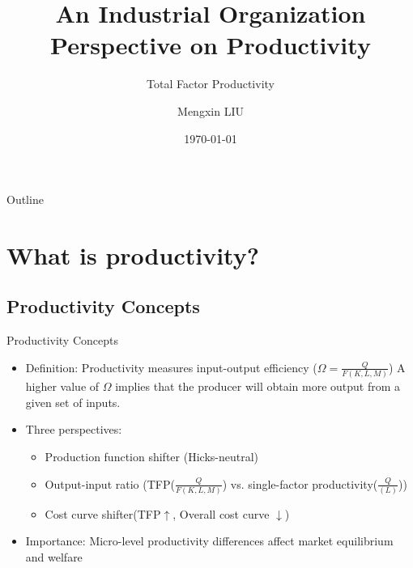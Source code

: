 \documentclass[aspectratio=169]{beamer}  %
\title{An Industrial Organization Perspective on Productivity}
\subtitle{Total Factor Productivity}
\author{Mengxin LIU}
\institute{Lingnan University}
\date{\today}
\begin{document}
\begin{frame}
    \titlepage
\end{frame}


\begin{frame}{Outline}
    \tableofcontents
\end{frame}

\section{What is productivity?}
\subsection{Productivity Concepts}
\begin{frame}{Productivity Concepts}
    \begin{itemize}
    \item Definition: Productivity measures input-output efficiency ($ \Omega = \frac{Q}{F(K,L,M)} $)
    A higher value of $\Omega$ implies that the producer will obtain more output from a given set of inputs.
    \item Three perspectives: \begin{itemize}
            \item Production function shifter (Hicks-neutral)
            \item Output-input ratio (TFP($\frac{Q}{F(K,L,M)} $) vs. single-factor productivity($\frac{Q}{(L)}$))
            \item Cost curve shifter(TFP$\uparrow$, Overall cost curve $\downarrow$)
        \end{itemize}
    \item Importance: Micro-level productivity differences affect market equilibrium and welfare
    \end{itemize}
\end{frame}
\end{document}
